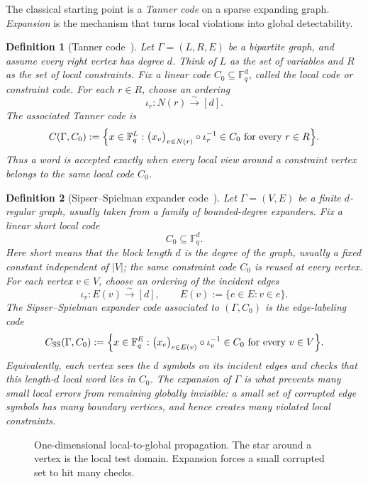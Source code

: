 \documentclass[10pt]{article}
\theoremstyle{compactdef}
\newtheorem{definition}{Definition}
\begin{document}
The classical starting point is a \emph{Tanner code} on a sparse expanding graph. \emph{Expansion} is the mechanism that turns local violations into global detectability.

\begin{definition}[Tanner code~\cite{Tanner1981}]
Let $\Gamma=(L,R,E)$ be a bipartite graph, and assume every right vertex has degree $d$. Think of $L$ as the set of \emph{variables} and $R$ as the set of \emph{local constraints}. Fix a linear code $C_0\subseteq \mathbb F_q^d$, called the \emph{local code} or \emph{constraint code}. For each $r\in R$, choose an ordering
\[
\iota_r:N(r)\xrightarrow{\sim}[d].
\]
The associated Tanner code is
\[
C(\Gamma,C_0):=\Bigl\{x\in \mathbb F_q^L:\bigl(x_v\bigr)_{v\in N(r)}\circ \iota_r^{-1}\in C_0\ \text{for every }r\in R\Bigr\}.
\]
Thus a word is accepted exactly when every \emph{local view} around a constraint vertex belongs to the same local code $C_0$.
\end{definition}

\begin{definition}[Sipser--Spielman expander code~\cite{SS}]
Let $\Gamma=(V,E)$ be a finite $d$-regular graph, usually taken from a family of bounded-degree expanders. Fix a linear \emph{short local code}
\[
C_0\subseteq \mathbb F_q^d.
\]
Here \emph{short} means that the block length $d$ is the degree of the graph, usually a fixed constant independent of $|V|$; the same constraint code $C_0$ is reused at every vertex.
For each vertex $v\in V$, choose an ordering of the incident edges
\[
\iota_v:E(v)\xrightarrow{\sim}[d],
\qquad E(v):=\{e\in E:v\in e\}.
\]
The Sipser--Spielman expander code associated to $(\Gamma,C_0)$ is the edge-labeling code
\[
C_{\mathrm{SS}}(\Gamma,C_0):=
\Bigl\{x\in \mathbb F_q^E:
\bigl(x_e\bigr)_{e\in E(v)}\circ \iota_v^{-1}\in C_0
\ \text{for every }v\in V\Bigr\}.
\]
Equivalently, each vertex sees the $d$ symbols on its incident edges and checks that this \emph{length-$d$ local word} lies in $C_0$. The \emph{expansion} of $\Gamma$ is what prevents many small local errors from remaining globally invisible: a small set of corrupted edge symbols has many boundary vertices, and hence creates many violated local constraints.~\cite{SS}
\end{definition}

\begin{figure}[h]
\centering
{}
\caption{One-dimensional local-to-global propagation. The star around a vertex is the local test domain. Expansion forces a small corrupted set to hit many checks.}
\end{figure}
\end{document}
